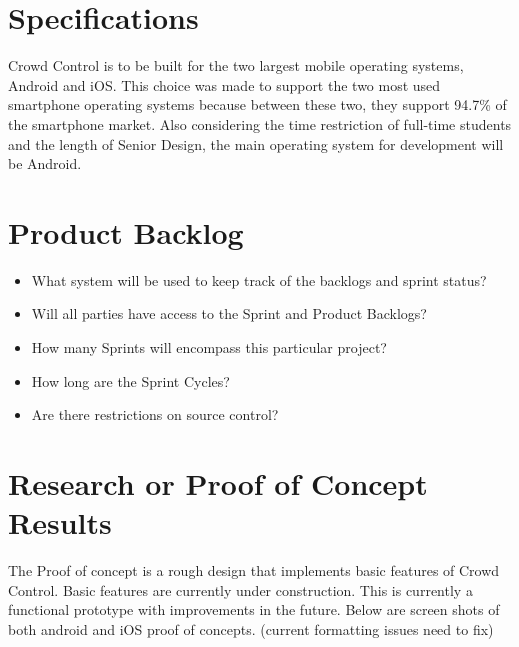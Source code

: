 \section{Specifications}  
Crowd Control is to be built for the two largest mobile operating systems, Android and iOS.  This choice was made to support the two most used smartphone operating systems because between these two, they support 94.7\% of the smartphone market.  Also considering the time restriction of full-time students and the length of Senior Design, the main operating system for development will be Android.

\section{Product Backlog}

 
\begin{itemize}
\item What system will be used to keep track of the backlogs and sprint status?
\item Will all parties have access to the Sprint and Product Backlogs?
\item How many Sprints will encompass this particular project?
\item How long are the Sprint Cycles?
\item Are there restrictions on source control? 
\end{itemize}


\section{Research or Proof of Concept Results}


The Proof of concept is a rough design that implements basic features of Crowd Control. Basic features are currently under construction. This is currently a functional prototype with improvements in the future.
\newline 
\newline
Below are screen shots of both android and iOS proof of concepts.
(current formatting issues need to fix)
